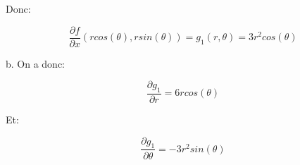 \documentclass[12pt,a4paper, french]{article}
\begin{document}
Donc:
\begin{center}
    \begin{equation*}
        \frac{\partial f}{\partial x}(rcos(\theta),rsin(\theta))=g_1(r,\theta)=3r^2cos(\theta)
    \end{equation*}
\end{center}

b. On a donc:
\begin{center}
    \begin{equation*}
        \frac{\partial g_1}{\partial r}=6rcos(\theta)
    \end{equation*}
\end{center}
Et:
\begin{center}
    \begin{equation*}
        \frac{\partial g_1}{\partial \theta}=-3r^2sin(\theta)
    \end{equation*}
\end{center}
\end{document}
